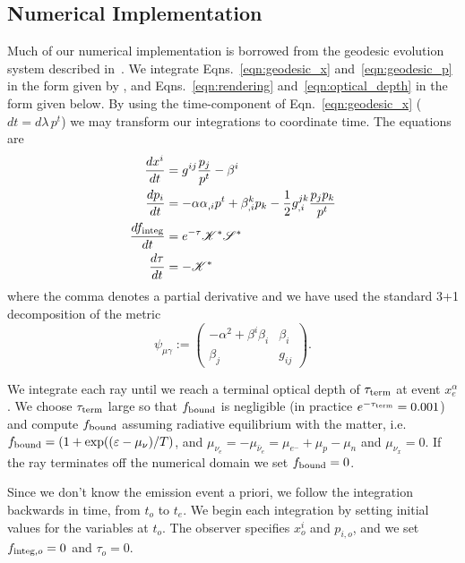 \documentclass[aps,floatfix,prd,superscriptaddress,twocolumn]{revtex4-1}
\newcommand{\todo}[1]{\marginpar{\tiny{\textcolor{red}{#1}}}}
\begin{document}
\subsection{Numerical Implementation}
\label{ssec:numerical}
Much of our numerical implementation is borrowed from the geodesic evolution
system described in~\cite{bohn2016-code}.
We integrate Eqns.~\ref{eqn:geodesic_x} and~\ref{eqn:geodesic_p} in the form
given by \citep{hugh1994-eh_finding},
and Eqns.~\ref{eqn:rendering} and~\ref{eqn:optical_depth}
in the form given below.
By using the time-component of Eqn.~\ref{eqn:geodesic_x} ($dt=d\lambda \, p^t$)
we may transform our integrations to coordinate time.
The equations are
\begin{align}
  \label{eqn:num_x}
  \frac{dx^i}{dt} &=
  g^{ij} \frac{p_j}{p^t} - \beta^{i}\\
  \label{eqn:num_p}
  \frac{dp_i}{dt} &=
  -\alpha \alpha_{,i} p^t
  + \beta^k_{,i} p_k
  - \frac{1}{2} g^{jk}_{,i}\frac{p_j p_k}{p^t}\\
  \label{eqn:num_finteg}
  \frac{df_{\rm integ}}{dt} &=
  e^{-\tau} \mathscr{K}^* \mathscr{S}^*\\
  \label{eqn:num_tau}
  \frac{d\tau}{dt} &=
  -\mathscr{K}^*
\end{align}
where the comma denotes a partial derivative
and we have used the standard 3+1 decomposition of the metric
\begin{equation}
  \label{eqn:adm_metric}
  \psi_{\mu\gamma} :=
  \left(
  \begin{matrix}
    -\alpha^2 + \beta^i \beta_i  & \beta_i \\
    \beta_j                      & g_{ij}
  \end{matrix}
  \right).
\end{equation}

We integrate each ray until we reach a terminal optical depth of
$\tau_{\rm term}$ at event $x_e^\alpha$.
We choose $\tau_{\rm term}$ large so that
$f_{\rm bound}$ is negligible
(in practice $e^{-\tau_{\rm term}}=0.001$)
and compute $f_{\rm bound}$ assuming radiative equilibrium with the matter,
i.e. $f_{\rm bound}=(1+\exp((\varepsilon-\mu_\nu)/T)$,
and $\mu_{\nu_e}=-\mu_{\bar{\nu}_e}=\mu_{e^{-}}+\mu_p-\mu_n$ and
$\mu_{\nu_x}=0$.
If the ray terminates off the numerical domain
we set $f_{\rm bound}=0$.

Since we don't know the emission event a priori,
\todo{make clear ``emission event'' doesn't involve physical assumption}
we follow the integration backwards in time,
from $t_o$ to $t_e$.
We begin each integration by setting initial values for the variables at $t_o$.
The observer specifies $x^i_o$ and $p_{i,o}$,
and we set $f_{{\rm integ},o}=0$ and $\tau_o=0$.
\end{document}
